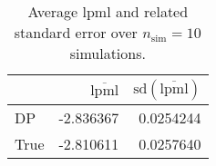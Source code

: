 \begin{table}[H]

\caption{Average lpml and related standard error over $n_{\text{sim}} = 10$ simulations.}
\centering
\begin{tabular}[t]{lrr}
\toprule
  & $\overbar{\text{lpml}}$ & $\text{sd}(\overbar{\text{lpml}})$\\
\midrule
DP & -2.836367 & 0.0254244\\
True & -2.810611 & 0.0257640\\
\bottomrule
\end{tabular}
\end{table}